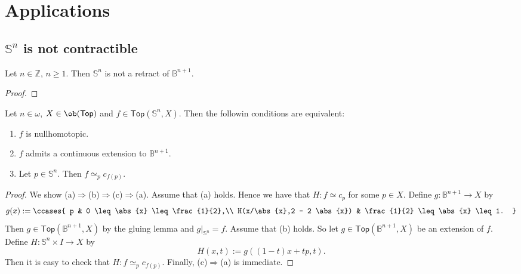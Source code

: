 \section*{Applications}
\subsection*{$\mathbb{S}^n$ is not contractible}

\begin{lemma}
	Let $n \in \mathbb{Z}$, $n \geq 1$. Then $\mathbb{S}^n$ is not a retract of $\mathbb{B}^{n + 1}$. 	
\end{lemma}

\begin{proof}
	
\end{proof}

\begin{proposition}
	Let $n \in \omega$, $X \in \ob(\mathsf{Top})$ and $f \in \mathsf{Top}(\mathbb{S}^n,X)$. Then the followin conditions are equivalent:
	\begin{enumerate}[label = \textup{(}\alph*\textup{)},wide = 0pt]
		\item $f$ is nullhomotopic.
		\item $f$ admits a continuous extension to $\mathbb{B}^{n+1}$.
		\item Let $p \in \mathbb{S}^n$. Then $f \simeq_p c_{f(p)}$.
	\end{enumerate}
\end{proposition}

\begin{proof}
	We show (a)$\Rightarrow$(b)$\Rightarrow$(c)$\Rightarrow$(a). Assume that (a) holds. Hence we have that $H : f \simeq c_p$ for some $p \in X$. Define $g : \mathbb{B}^{n+1} \to X$ by
	\begin{equation*}
		g(x) := \ccases{
			p & 0 \leq \abs{x} \leq \frac{1}{2},\\
			H(x/\abs{x},2 - 2 \abs{x}) & \frac{1}{2} \leq \abs{x} \leq 1.
		}
	\end{equation*}
	Then $g \in \mathsf{Top}(\mathbb{B}^{n+1},X)$ by the gluing lemma and $g\vert_{\mathbb{S}^n} = f$. Assume that (b) holds. So let $g \in \mathsf{Top}(\mathbb{B}^{n+1},X)$ be an extension of $f$. Define $H : \mathbb{S}^n \times I \to X$ by
	\begin{equation*}
		H(x,t) := g((1 - t)x + tp,t).
	\end{equation*}
	Then it is easy to check that $H : f \simeq_p c_{f(p)}$. Finally, (c)$\Rightarrow$(a) is immediate.
\end{proof}

